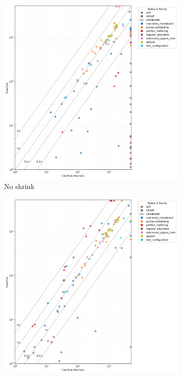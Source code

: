 \begin{figure}[!t]
    \centering
    \begin{subfigure}[t]{0.3\textwidth}
            \centering
            \includegraphics[width=\textwidth]{figs/globalnoshrink_heuristic_comparison.jpg}
            \caption{No shrink}
            \label{fig:cautical-vs-cadical}
    \end{subfigure}
    \begin{subfigure}[t]{0.3\textwidth}
        \centering
        \includegraphics[width=\textwidth]{figs/globalorderi_heuristic_comparison.jpg}

\end{subfigure}
\end{figure}
